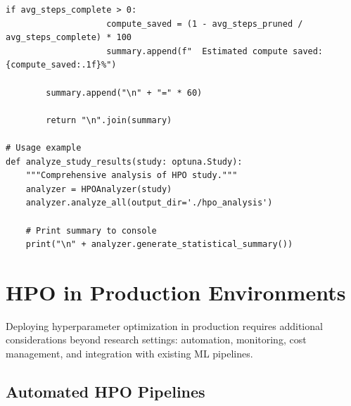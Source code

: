 \begin{lstlisting}[style=python, caption=Comprehensive HPO analysis and visualization]
                if avg_steps_complete > 0:
                    compute_saved = (1 - avg_steps_pruned / avg_steps_complete) * 100
                    summary.append(f"  Estimated compute saved: {compute_saved:.1f}%")

        summary.append("\n" + "=" * 60)

        return "\n".join(summary)

# Usage example
def analyze_study_results(study: optuna.Study):
    """Comprehensive analysis of HPO study."""
    analyzer = HPOAnalyzer(study)
    analyzer.analyze_all(output_dir='./hpo_analysis')

    # Print summary to console
    print("\n" + analyzer.generate_statistical_summary())
\end{lstlisting}

\section{HPO in Production Environments}

Deploying hyperparameter optimization in production requires additional considerations beyond research settings: automation, monitoring, cost management, and integration with existing ML pipelines.

\subsection{Automated HPO Pipelines}


